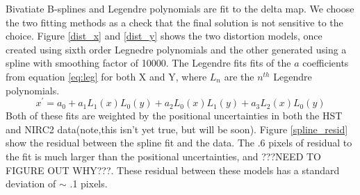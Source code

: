 Bivatiate B-splines and Legendre polynomials are fit to the delta map.  We choose the two fitting methods as a check that the final solution is not sensitive to the choice.  Figure \ref{dist_x} and \ref{dist_y} shows the two distortion models, once created using sixth order Legnedre polynomials and the other generated using a spline with smoothing factor of 10000.  The Legendre fits fits of the $a$ coefficients from equation \ref{eq:leg} for both X and Y, where $L_{n}$ are the $n^{th}$ Legendre polynomials.  
\begin{equation}
x^{'} = a_{0} + a_{1}L_{1}(x)L_{0}(y) +  a_{2}L_{0}(x)L_{1}(y) + a_{3}L_{2}(x)L_{0}(y)
\label{eg:leg}
\end{equation}
Both of these fits are weighted by the positional uncertainties in both the HST and NIRC2 data(note,this isn't yet true, but will be soon). Figure \ref{spline_resid} show the residual between the spline fit and the data.  The .6 pixels of residual to the fit is much larger than the positional uncertainties, and ???NEED TO FIGURE OUT WHY???.  These residual between these models has a standard deviation of $\sim$ .1 pixels.

